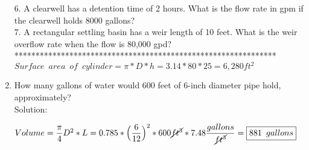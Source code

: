 \documentclass{article}
\begin{document}
\begin{enumerate}
6. A clearwell has a detention time of 2 hours. What is the flow rate in gpm if the
clearwell holds 8000 gallons?\\

7. A rectangular settling basin has a weir length of 10 feet. What is the weir overflow
rate when the flow is 80,000 gpd?\\

**************************************************************\\

$Surface \enspace area \enspace of \enspace cylinder=\pi*D*h=3.14*80*25=\boxed{6,280ft^2}$
\item How many gallons of water would 600 feet of 6-inch diameter pipe hold, approximately?\\
\vspace{0.3cm}
Solution:\\

\vspace{0.3cm}
\vspace{0.3cm}
$Volume=\dfrac{\pi}{4}D^2*L=0.785*\Big(\dfrac{6}{12}\Big)^2*600\cancel{ft^3}*7.48\dfrac{gallons}{\cancel{ft^3}}=\boxed{881 \enspace gallons}$
\end{enumerate}
\end{document}
